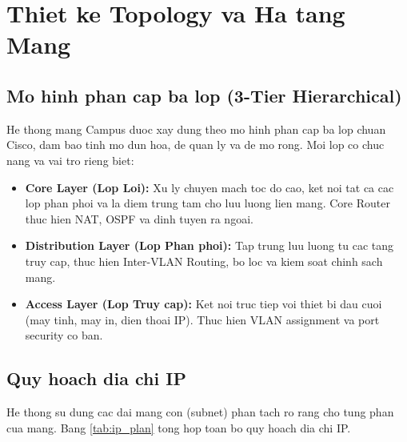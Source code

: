 \chapter{Thiet ke Topology va Ha tang Mang}

\section{Mo hinh phan cap ba lop (3-Tier Hierarchical)}

He thong mang Campus duoc xay dung theo mo hinh phan cap ba lop chuan Cisco, dam bao tinh mo dun hoa, de quan ly va de mo rong. Moi lop co chuc nang va vai tro rieng biet:

\begin{itemize}
    \item \textbf{Core Layer (Lop Loi):} Xu ly chuyen mach toc do cao, ket noi tat ca cac lop phan phoi va la diem trung tam cho luu luong lien mang. Core Router thuc hien NAT, OSPF va dinh tuyen ra ngoai.
    \item \textbf{Distribution Layer (Lop Phan phoi):} Tap trung luu luong tu cac tang truy cap, thuc hien Inter-VLAN Routing, bo loc va kiem soat chinh sach mang.
    \item \textbf{Access Layer (Lop Truy cap):} Ket noi truc tiep voi thiet bi dau cuoi (may tinh, may in, dien thoai IP). Thuc hien VLAN assignment va port security co ban.
\end{itemize}

\section{Quy hoach dia chi IP}

He thong su dung cac dai mang con (subnet) phan tach ro rang cho tung phan cua mang. Bang \ref{tab:ip_plan} tong hop toan bo quy hoach dia chi IP.


